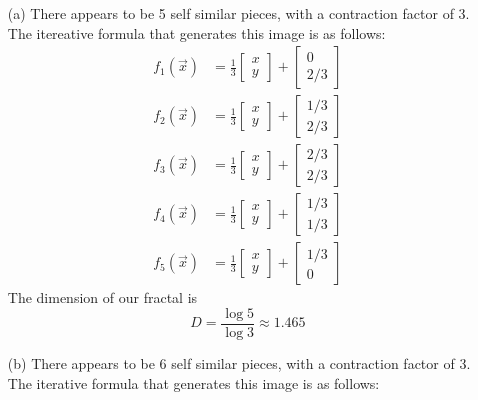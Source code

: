 \documentclass[12pt]{article}
\begin{document}
\begin{itemize}
	\item[(a)] There appears to be 5 self similar pieces, with a contraction factor of 3. The itereative formula that generates this image is as follows:
	\begin{align*}
		f_1(\vec{x}) &= \frac{1}{3} \begin{bmatrix}
			x \\
			y
		\end{bmatrix} + \begin{bmatrix}
			0 \\
			2/3
		\end{bmatrix} \\
		f_2(\vec{x}) &= \frac{1}{3} \begin{bmatrix}
			x \\
			y
		\end{bmatrix} + \begin{bmatrix}
			1/3 \\
			2/3
		\end{bmatrix} \\
		f_3(\vec{x}) &= \frac{1}{3} \begin{bmatrix}
			x \\
			y
		\end{bmatrix} + \begin{bmatrix}
			2/3 \\
			2/3
		\end{bmatrix} \\
		f_4(\vec{x}) &= \frac{1}{3} \begin{bmatrix}
			x \\
			y
		\end{bmatrix} + \begin{bmatrix}
			1/3 \\
			1/3
		\end{bmatrix} \\
		f_5(\vec{x}) &= \frac{1}{3} \begin{bmatrix}
			x \\
			y
		\end{bmatrix} + \begin{bmatrix}
			1/3 \\
			0
		\end{bmatrix}
	\end{align*}
	The dimension of our fractal is
	\[
		D = \frac{\log 5}{\log 3} \approx 1.465
	\]
	\item[(b)] There appears to be 6 self similar pieces, with a contraction factor of 3. The iterative formula that generates this image is as follows:

\end{itemize}
\end{document}
